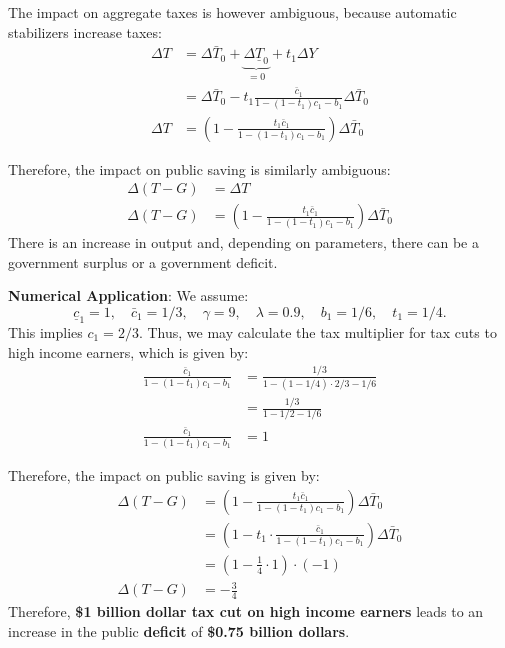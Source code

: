 \documentclass[]{book}
\theoremstyle{definition}
\theoremstyle{definition}
\theoremstyle{definition}
\theoremstyle{remark}
\begin{document}
The impact on aggregate taxes is however ambiguous, because automatic
stabilizers increase taxes: \[
\begin{aligned}
\Delta T    &=\Delta\bar{T}_{0}+\underbrace{\Delta\underline{T}_{0}}_{=0}+t_1\Delta Y\\
&=\Delta\bar{T}_{0} - t_1 \frac{\bar{c}_{1}}{1-\left(1-t_{1}\right)c_{1}-b_{1}}\Delta\bar{T}_{0}\\
\Delta T    &=\left(1-\frac{t_1\bar{c}_{1}}{1-\left(1-t_{1}\right)c_{1}-b_{1}}\right)\Delta\bar{T}_{0}
\end{aligned}
\]

Therefore, the impact on public saving is similarly ambiguous: \[
\begin{aligned}
\Delta\left(T-G\right)&=\Delta T \\
\Delta\left(T-G\right)&=\left(1-\frac{t_1\bar{c}_{1}}{1-\left(1-t_{1}\right)c_{1}-b_{1}}\right)\Delta\bar{T}_{0}
\end{aligned}
\] There is an increase in output and, depending on parameters, there
can be a government surplus or a government deficit.

\textbf{Numerical Application}: We assume:
\[\underline{c}_{1}=1, \quad \bar{c}_{1}=1/3,\quad \gamma=9, \quad\lambda=0.9,\quad b_1=1/6, \quad t_1=1/4.\]
This implies \(c_1=2/3.\) Thus, we may calculate the tax multiplier for
tax cuts to high income earners, which is given by: \[
\begin{aligned}
\frac{\bar{c}_{1}}{1-(1-t_1)c_{1}-b_{1}} &= \frac{1/3}{1-(1-1/4) \cdot 2/3-1/6}\\
&= \frac{1/3}{1-1/2-1/6}\\
\frac{\bar{c}_{1}}{1-(1-t_1)c_{1}-b_{1}} &=1
\end{aligned}
\]

Therefore, the impact on public saving is given by: \[
\begin{aligned}
\Delta\left(T-G\right)&=\left(1-\frac{t_1\bar{c}_{1}}{1-\left(1-t_{1}\right)c_{1}-b_{1}}\right)\Delta\bar{T}_{0}\\
&=\left(1-t_1 \cdot \frac{\bar{c}_{1}}{1-\left(1-t_{1}\right)c_{1}-b_{1}}\right)\Delta\bar{T}_{0}\\
&=\left(1-\frac{1}{4} \cdot 1\right) \cdot (-1)\\
\Delta\left(T-G\right)&=-\frac{3}{4}
\end{aligned}
\] Therefore, \textbf{\$1 billion dollar tax cut on high income earners}
leads to an increase in the public \textbf{deficit} of \textbf{\$0.75
billion dollars}.
\end{document}

